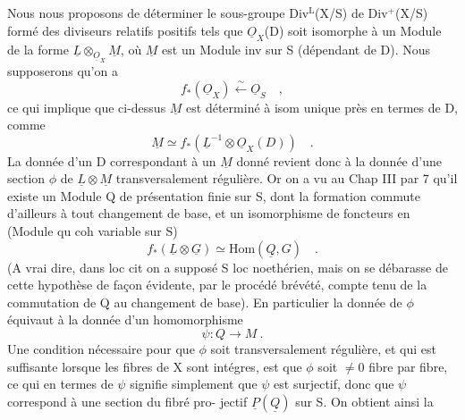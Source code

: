 
Nous nous proposons de déterminer le sous-groupe Div$^{\mathrm{L}}$(X/S) de Div$^{+}$(X/S)
formé des diviseurs relatifs positifs tels que $\underline{O}_X$(D) soit isomorphe à
un Module de la forme $\underline{L}\otimes_{\underline{O}_X}\underline{M}$, où $\underline{M}$ est un Module inv sur S (dépendant de
D). Nous supposerons qu'on a
\[ f_{*}(\underline{O}_X)\overset{\sim}{\longleftarrow}\underline{O}_S \quad , \]
ce qui implique que ci-dessus $\underline{M}$ est déterminé à isom unique près en termes
de D, comme
\[ \underline{M}\simeq f_{*}(\underline{L}^{-1}\otimes\underline{O}_X(D)) \quad . \]
La donnée d'un D correspondant à un $\underline{M}$ donné revient donc à la donnée
d'une section $\phi$ de $\underline{L}\otimes\underline{M}$ transversalement régulière. Or on a vu au
Chap III par 7  qu'il  existe un Module Q de
présentation finie sur S, dont la formation commute d'ailleurs à tout
changement de base, et un isomorphisme de foncteurs en  (Module qu coh
variable sur S)
\[ f_{*}(\underline{L}\otimes\underline{G})\simeq \mathrm{Hom}(\underline{Q},G) \quad . \]
(A vrai dire, dans loc cit on a supposé S loc noethérien, mais on se
débarasse de cette hypothèse de façon évidente, par le procédé brévété,
compte tenu de la commutation de Q au changement de base). En particulier
la donnée de $\phi$ équivaut à  la donnée d'un homomorphisme
\[ \psi : Q \longrightarrow M \ . \]
Une condition nécessaire pour que $\phi$ soit transversalement régulière, et
qui est suffisante lorsque les fibres de X sont intégres, est que $\phi$ soit
$\neq 0$  fibre par fibre, ce qui en termes de $\psi$ signifie simplement que
$\psi$ est surjectif, donc que  $\psi$ correspond à une section du fibré pro-%
jectif $\underline{P}(\underline{Q})$ sur S. On obtient ainsi la

